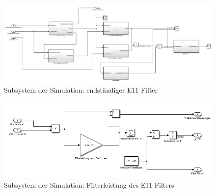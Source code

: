     \begin{figure}[H]
        \begin{center}
            \includegraphics[width=\linewidth]{images/sim_e11.png}
            \caption[Simulation E11 Filter]{Subsystem der Simulation: endständiger E11 Filter}
            \label{fi:sim_e11}
        \end{center}
    \end{figure}
    \begin{figure}[H]
        \begin{center}
            \includegraphics[width=\linewidth]{images/sim_filterleistung.png}
            \caption[Subsystem Filterleistung]{Subsystem der Simulation: Filterleistung des E11 Filters}
            \label{fi:sim_filterleistung}
        \end{center}
    \end{figure}
